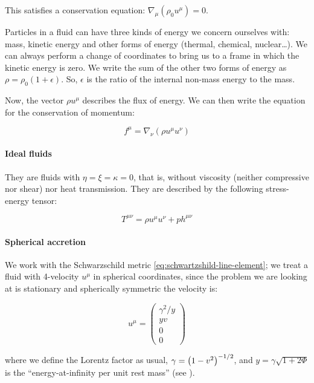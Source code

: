 \documentclass[main.tex]{subfiles}
\begin{document}
This satisfies a conservation equation: $\nabla_\mu(\rho_0 u^\mu) = 0$.

Particles in a fluid can have three kinds of energy we concern ourselves with: mass, kinetic energy and other forms of energy (thermal, chemical, nuclear\dots).
We can always perform a change of coordinates to bring us to a frame in which the kinetic energy is zero. We write the sum of the other two forms of energy as $\rho = \rho_0 (1+\epsilon)$. So, $\epsilon$ is the ratio of the internal non-mass energy to the mass.

Now, the vector $\rho u^\mu$ describes the flux of energy.
We can then write the equation for the conservation of momentum:

\begin{equation}
    f^\mu = \nabla_\nu (\rho u^\mu u^\nu)
\end{equation}

\paragraph{Ideal fluids}

They are fluids with \(\eta=\xi=\kappa=0\), that is, without viscosity (neither compressive nor shear) nor heat transmission.
They are described by the following stress-energy tensor:

\begin{equation}
    T^{\mu\nu} = \rho u^\mu u^\nu + p h^{\mu\nu}
\end{equation}

\paragraph{Spherical accretion}

We work with the Schwarzschild metric \eqref{eq:schwartzshild-line-element}; we treat a fluid with 4-velocity $u^\mu$ in spherical coordinates, since the problem we are looking at is stationary and spherically symmetric the velocity is:

\begin{equation}
    u^\mu = \begin{pmatrix}
        \gamma^2 / y\\
        yv\\
        0\\
        0
    \end{pmatrix}
\end{equation}

where we define the Lorentz factor as usual, $\gamma = \qty(1-v^2)^{-1/2}$, and $y=\gamma \sqrt{1+2\Phi}$ is the ``energy-at-infinity per unit rest mass'' (see \cite[equation 3]{ThorneFLammmangZytkow:1981feb}).
\end{document}
